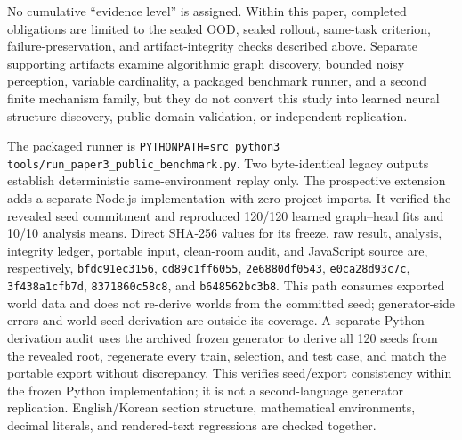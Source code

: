No cumulative ``evidence level'' is assigned.  Within this paper, completed
obligations are limited to the sealed OOD, sealed rollout, same-task criterion,
failure-preservation, and artifact-integrity checks described above.  Separate
supporting artifacts examine algorithmic graph discovery, bounded noisy
perception, variable cardinality, a packaged benchmark runner, and a second
finite mechanism family, but they do not convert this study into learned neural
structure discovery, public-domain validation, or independent replication.

The packaged runner is \texttt{PYTHONPATH=src python3}
\texttt{tools/run\_paper3\_public\_benchmark.py}.
Two byte-identical legacy outputs establish deterministic same-environment
replay only.  The prospective extension adds a separate Node.js implementation
with zero project imports.  It verified the revealed seed commitment and
reproduced 120/120 learned graph--head fits and 10/10 analysis means.  Direct
SHA-256 values for its freeze, raw result, analysis, integrity ledger, portable
input, clean-room audit, and JavaScript source are, respectively,
\texttt{bfdc91ec3156}, \texttt{cd89c1ff6055}, \texttt{2e6880df0543},
\texttt{e0ca28d93c7c}, \texttt{3f438a1cfb7d}, \texttt{8371860c58c8}, and
\texttt{b648562bc3b8}.  This path consumes exported world data and does not
re-derive worlds from the committed seed; generator-side errors and world-seed
derivation are outside its coverage.  A separate Python derivation audit uses
the archived frozen generator to derive all 120 seeds from the revealed root,
regenerate every train, selection, and test case, and match the portable export
without discrepancy.  This verifies seed/export consistency within the frozen
Python implementation; it is not a second-language generator replication.
English/Korean section structure,
mathematical environments, decimal literals, and rendered-text regressions are
checked together.
